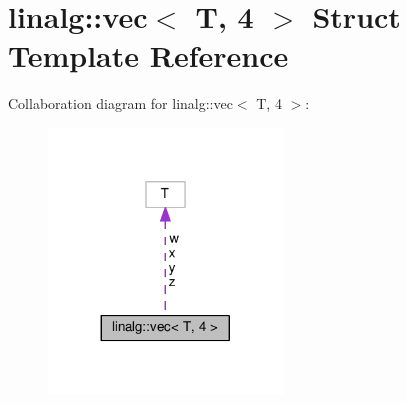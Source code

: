 \hypertarget{structlinalg_1_1vec_3_01T_00_014_01_4}{}\section{linalg\+:\+:vec$<$ T, 4 $>$ Struct Template Reference}
\label{structlinalg_1_1vec_3_01T_00_014_01_4}


Collaboration diagram for linalg\+:\+:vec$<$ T, 4 $>$\+:
\nopagebreak
\begin{figure}[H]
\begin{center}
\leavevmode
\includegraphics[width=176pt]{structlinalg_1_1vec_3_01T_00_014_01_4__coll__graph}
\end{center}
\end{figure}
